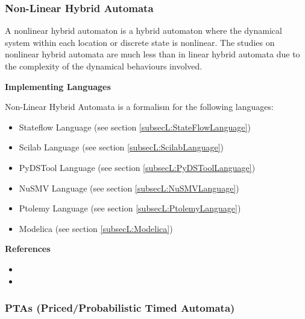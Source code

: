 \subsubsection{Non-Linear Hybrid Automata}
\label{subsecF:HybridAutomataNonLinear}


A nonlinear hybrid automaton is a hybrid automaton where the dynamical system within each location or discrete state is nonlinear. The studies on nonlinear hybrid automata are much less than in linear hybrid automata due to the complexity of the dynamical behaviours involved.

\textbf{Implementing Languages}

Non-Linear Hybrid Automata is a formalism for the following languages:
\begin{itemize}
	\item Stateflow Language (see section \ref{subsecL:StateFlowLanguage})
	\item Scilab Language (see section \ref{subsecL:ScilabLanguage})
	\item PyDSTool Language (see section \ref{subsecL:PyDSToolLanguage})
	\item NuSMV Language (see section \ref{subsecL:NuSMVLanguage})
	\item Ptolemy Language (see section \ref{subsecL:PtolemyLanguage})
	\item Modelica (see section \ref{subsecL:Modelica})
\end{itemize}





\textbf{References}
\begin{itemize}
	
\item {}
	
\item {}
\end{itemize}



\subsubsection{PTAs (Priced/Probabilistic Timed Automata)}
\label{subsecF:PTAs}

